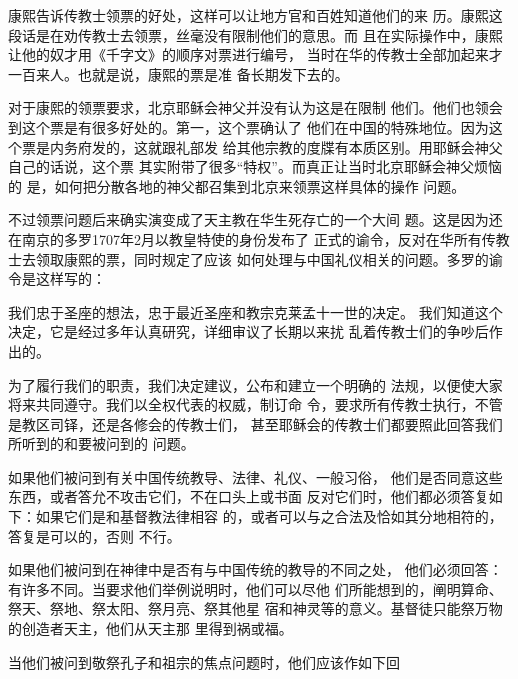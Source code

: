 \par
康熙告诉传教士领票的好处，这样可以让地方官和百姓知道他们的来%
历。康熙这段话是在劝传教士去领票，丝毫没有限制他们的意思。而%
且在实际操作中，康熙让他的奴才用《千字文》的顺序对票进行编号，%
当时在华的传教士全部加起来才一百来人。也就是说，康熙的票是准%
备长期发下去的。%
\par
对于康熙的领票要求，北京耶稣会神父并没有认为这是在限制%
他们。他们也领会到这个票是有很多好处的。第一，这个票确认了%
他们在中国的特殊地位。因为这个票是内务府发的，这就跟礼部发%
给其他宗教的度牒有本质区别。用耶稣会神父自己的话说，这个票%
其实附带了很多“特权”。而真正让当时北京耶稣会神父烦恼的%
是，如何把分散各地的神父都召集到北京来领票这样具体的操作%
问题。%
\par
不过领票问题后来确实演变成了天主教在华生死存亡的一个大间%
题。这是因为还在南京的多罗1707年2月以教皇特使的身份发布了%
正式的谕令，反对在华所有传教士去领取康熙的票，同时规定了应该%
如何处理与中国礼仪相关的问题。多罗的谕令是这样写的：%
\par
{\bookkai 我们忠于圣座的想法，忠于最近圣座和教宗克莱孟十一世的决定。}%
{\bookkai 我们知道这个决定，它是经过多年认真研究，详细审议了长期以来扰}%
{\bookkai 乱着传教士们的争吵后作出的。}%
\par
{\bookkai 为了履行我们的职责，我们决定建议，公布和建立一个明确的}%
{\bookkai 法规，以便使大家将来共同遵守。我们以全权代表的权威，制订命}%
{\bookkai 令，要求所有传教士执行，不管是教区司铎，还是各修会的传教士们，}%
{\bookkai 甚至耶稣会的传教士们都要照此回答我们所听到的和要被问到的}%
{\bookkai 问题。}%
\par
{\bookkai 如果他们被问到有关中国传统教导、法律、礼仪、一般习俗，}%
{\bookkai 他们是否同意这些东西，或者答允不攻击它们，不在口头上或书面}%
{\bookkai 反对它们时，他们都必须答复如下：如果它们是和基督教法律相容}%
{\bookkai 的，或者可以与之合法及恰如其分地相符的，答复是可以的，否则}%
{\bookkai 不行。}%
\par
{\bookkai 如果他们被问到在神律中是否有与中国传统的教导的不同之处，}%
{\bookkai 他们必须回答：有许多不同。当要求他们举例说明时，他们可以尽他}%
{\bookkai 们所能想到的，阐明算命、祭天、祭地、祭太阳、祭月亮、祭其他星}%
{\bookkai 宿和神灵等的意义。基督徒只能祭万物的创造者天主，他们从天主那}%
{\bookkai 里得到祸或福。}%
\par
{\bookkai 当他们被问到敬祭孔子和祖宗的焦点问题时，他们应该作如下回}%
